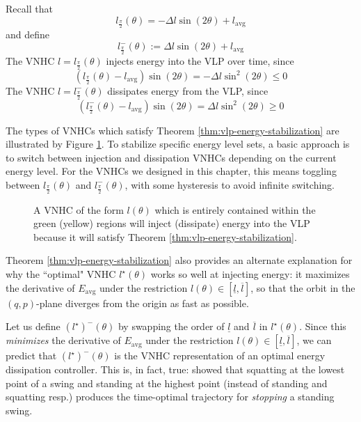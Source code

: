 \begin{cor}
   Recall that
   \[
      l_\frac{\pi}{2}(\theta) = -\Delta l \sin(2\theta) + l_\text{avg}
   \]
   and define 
   \[
      l^{-}_\frac{\pi}{2}(\theta) := \Delta l \sin(2\theta) + l_\text{avg}
   \]
   The VNHC \(l = l_\frac{\pi}{2}(\theta)\) injects energy into the VLP
   over time, since 
   \[
      \left(l_\frac{\pi}{2}(\theta) - l_\text{avg}\right)\sin(2\theta) = 
      -\Delta l \sin^2(2\theta) \leq 0
   \] 
   The VNHC \(l = l^{-}_\frac{\pi}{2}(\theta)\) dissipates energy
   from the VLP, since 
   \[
      \left(l^{-}_\frac{\pi}{2}(\theta) - l_\text{avg}\right)\sin(2\theta) = 
      \Delta l \sin^2(2\theta) \geq 0
   \] 
\end{cor}

The types of VNHCs which satisfy Theorem \ref{thm:vlp-energy-stabilization} are
illustrated by Figure \ref{fig:vlp-energy-in-out}. 
To stabilize specific energy level sets, a basic approach is to switch
between injection and dissipation VNHCs depending on the current energy level.
For the VNHCs we designed in this chapter, this means toggling
between \(l_\frac{\pi}{2}(\theta)\) and \(l^{-}_\frac{\pi}{2}(\theta)\),
with some hysteresis to avoid infinite switching.  

\begin{figure}
   \centering
   
   \caption{A VNHC of the form \(l(\theta)\) which is entirely contained within
      the green (yellow) regions will inject (dissipate) energy into the VLP
      because it will satisfy Theorem \ref{thm:vlp-energy-stabilization}.}
      \label{fig:vlp-energy-in-out}
\end{figure}

Theorem \ref{thm:vlp-energy-stabilization} also provides an alternate
explanation for why the ``optimal" VNHC \(l^\star(\theta)\) works so well at
injecting energy: it maximizes the derivative of \(E_\text{avg}\) under the
restriction \(l(\theta) \in [\underline{l},\overline{l}]\), so that the orbit in the
\((q,p)\)-plane diverges from the origin as fast as possible. 

Let us define \((l^\star)^{-}(\theta)\) by swapping the order of 
\(\underline{l}\) and \(\overline{l}\) in \(l^\star(\theta)\). Since this 
\textit{minimizes} the derivative of \(E_\text{avg}\) under the restriction
\(l(\theta) \in [\underline{l},\overline{l}]\), we can predict that 
\((l^\star)^{-}(\theta)\) is the VNHC representation of an optimal 
energy dissipation controller.
This is, in fact, true: \cite{pumping_swing_standing_squatting} showed 
that squatting at the lowest point of a swing and standing at the highest
point (instead of standing and squatting resp.) produces the
time-optimal trajectory for \textit{stopping} a standing swing. 

